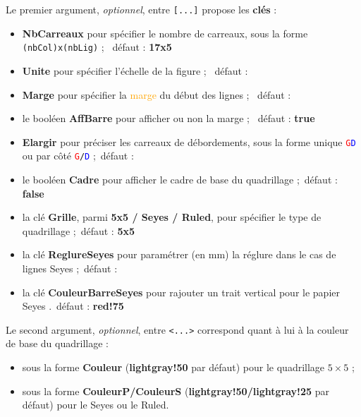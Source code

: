 \documentclass[a4paper]{article}
\newcommand\Cle[1]{{\bfseries\sffamily\textlangle #1\textrangle}}
\begin{document}
Le premier argument, \textit{optionnel}, entre \texttt{[...]} propose les \Cle{clés} :

\begin{itemize}
	\item \Cle{NbCarreaux} pour spécifier le nombre de carreaux, sous la forme \texttt{(nbCol)x(nbLig)} ; \hfill~défaut : \Cle{17x5}
	\item \Cle{Unite} pour spécifier l'échelle de la figure ; \hfill~défaut : \Cle{1}
	\item \Cle{Marge} pour spécifier la \textcolor{orange}{marge} du début des lignes ; \hfill~défaut : \Cle{0}
	\item le booléen \Cle{AffBarre} pour afficher ou non la marge ; \hfill~défaut : \Cle{true}
	\item \Cle{Elargir} pour préciser les carreaux de débordements, sous la forme unique \texttt{\textcolor{red}{G}\textcolor{blue}{D}} ou par côté \texttt{\textcolor{red}{G}/\textcolor{blue}{D}} ;\hfill~défaut : \Cle{0}
	\item le booléen \Cle{Cadre} pour afficher le cadre de base du quadrillage ;\hfill~défaut : \Cle{false}
	\item la clé \Cle{Grille}, parmi \Cle{5x5 / Seyes / Ruled}, pour spécifier le type de quadrillage ;\hfill~défaut : \Cle{5x5}
	\item la clé \Cle{ReglureSeyes} pour paramétrer (en mm) la réglure dans le cas de lignes Seyes ;\hfill~défaut : \Cle{2}
	\item la clé \Cle{CouleurBarreSeyes} pour rajouter un trait vertical pour le papier Seyes .\hfill~défaut : \Cle{red!75}
\end{itemize}

Le second argument, \textit{optionnel}, entre \texttt{<...>} correspond quant à lui à la couleur de base du quadrillage :

\begin{itemize}
	\item sous la forme \Cle{Couleur} (\Cle{lightgray!50} par défaut) pour le quadrillage $5\times5$ ;
	\item sous la forme \Cle{CouleurP/CouleurS} (\Cle{lightgray!50/lightgray!25} par défaut) pour le Seyes ou le Ruled.
\end{itemize}

\medskip
\end{document}
